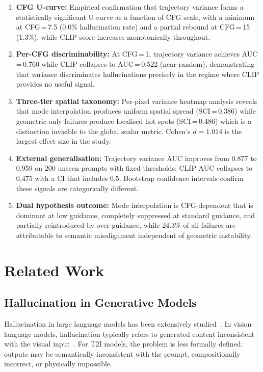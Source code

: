 \documentclass[conference]{IEEEtran}
\begin{document}
\begin{enumerate}
  \item \textbf{CFG U-curve:} Empirical confirmation that trajectory
  variance forms a statistically significant U-curve as a function
  of CFG scale, with a minimum at CFG\,=\,7.5 (0.0\% hallucination
  rate) and a partial rebound at CFG\,=\,15 (1.3\%), while CLIP
  score increases monotonically throughout.

  \item \textbf{Per-CFG discriminability:} At CFG\,=\,1, trajectory
  variance achieves AUC\,=\,0.760 while CLIP collapses to
  AUC\,=\,0.522 (near-random), demonstrating that variance
  discriminates hallucinations precisely in the regime where CLIP
  provides no useful signal.

  \item \textbf{Three-tier spatial taxonomy:} Per-pixel variance
  heatmap analysis reveals that mode interpolation produces uniform
  spatial spread (SCI\,=\,0.386) while geometric-only failures
  produce localised hot-spots (SCI\,=\,0.486) which is a distinction
  invisible to the global scalar metric. Cohen's $d{=}1.014$ is
  the largest effect size in the study.

  \item \textbf{External generalisation:} Trajectory variance AUC
  improves from 0.877 to 0.959 on 200 unseen prompts with fixed
  thresholds; CLIP AUC collapses to 0.475 with a CI that includes
  0.5. Bootstrap confidence intervals confirm these signals are
  categorically different.

  \item \textbf{Dual hypothesis outcome:} Mode interpolation is
  CFG-dependent that is dominant at low guidance, completely suppressed
  at standard guidance, and partially reintroduced by
  over-guidance, while 24.3\% of all failures are attributable
  to semantic misalignment independent of geometric instability.
\end{enumerate}

\section{Related Work}
\label{sec:related}

\subsection{Hallucination in Generative Models}
Hallucination in large language models has been extensively
studied~\cite{ji2023survey}. In vision-language models, hallucination
typically refers to generated content inconsistent with the visual
input~\cite{li2023evaluating}. For T2I models, the problem is less
formally defined: outputs may be semantically inconsistent with the
prompt, compositionally incorrect, or physically impossible.
\end{document}
